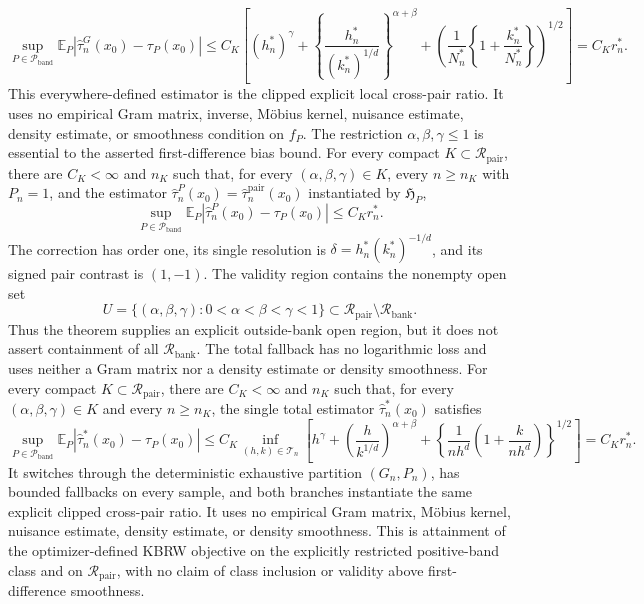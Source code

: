 \[
 \sup_{P\in\mathcal P_{\mathrm{band}}}
 \mathbb E_P\left|\widehat\tau_n^G(x_0)-\tau_P(x_0)\right|
 \leq C_K\left[(h_n^*)^\gamma+
 \left\{\frac{h_n^*}{(k_n^*)^{1/d}}\right\}^{\alpha+\beta}
 +\left(\frac1{N_n^*}\left\{1+\frac{k_n^*}{N_n^*}\right\}\right)^{1/2}\right]
 =C_Kr_n^*.
\]
This everywhere-defined estimator is the clipped explicit local cross-pair ratio.  It uses no empirical Gram matrix, inverse, M\"obius kernel, nuisance estimate, density estimate, or smoothness condition on \(f_P\).  The restriction \(\alpha,\beta,\gamma\leq1\) is essential to the asserted first-difference bias bound.
For every compact \(K\subset\mathcal R_{\mathrm{pair}}\), there are \(C_K<\infty\) and \(n_K\) such that, for every \((\alpha,\beta,\gamma)\in K\), every \(n\geq n_K\) with \(P_n=1\), and the estimator \(\widehat\tau_n^P(x_0)=\widehat\tau_n^{\mathrm{pair}}(x_0)\) instantiated by \(\mathfrak H_P\),
\[
 \sup_{P\in\mathcal P_{\mathrm{band}}}
 \mathbb E_P\left|\widehat\tau_n^P(x_0)-\tau_P(x_0)\right|\leq C_Kr_n^*.
\]
The correction has order one, its single resolution is \(\delta=h_n^*(k_n^*)^{-1/d}\), and its signed pair contrast is \((1,-1)\).  The validity region contains the nonempty open set
\[
 U=\{(\alpha,\beta,\gamma):0<\alpha<\beta<\gamma<1\}
 \subset\mathcal R_{\mathrm{pair}}\setminus\mathcal R_{\mathrm{bank}}.
\]
Thus the theorem supplies an explicit outside-bank open region, but it does not assert containment of all \(\mathcal R_{\mathrm{bank}}\).  The total fallback has no logarithmic loss and uses neither a Gram matrix nor a density estimate or density smoothness.
For every compact \(K\subset\mathcal R_{\mathrm{pair}}\), there are \(C_K<\infty\) and \(n_K\) such that, for every \((\alpha,\beta,\gamma)\in K\) and every \(n\geq n_K\), the single total estimator \(\widehat\tau_n^*(x_0)\) satisfies
\[
 \sup_{P\in\mathcal P_{\mathrm{band}}}\mathbb E_P\left|\widehat\tau_n^*(x_0)-\tau_P(x_0)\right|
 \leq C_K\inf_{(h,k)\in\mathcal T_n}\left[h^\gamma+
 \left(\frac{h}{k^{1/d}}\right)^{\alpha+\beta}+
 \left\{\frac1{nh^d}\left(1+\frac{k}{nh^d}\right)\right\}^{1/2}\right]
 =C_Kr_n^*.
\]
It switches through the deterministic exhaustive partition \((G_n,P_n)\), has bounded fallbacks on every sample, and both branches instantiate the same explicit clipped cross-pair ratio.  It uses no empirical Gram matrix, M\"obius kernel, nuisance estimate, density estimate, or density smoothness.  This is attainment of the optimizer-defined KBRW objective on the explicitly restricted positive-band class and on \(\mathcal R_{\mathrm{pair}}\), with no claim of class inclusion or validity above first-difference smoothness.

